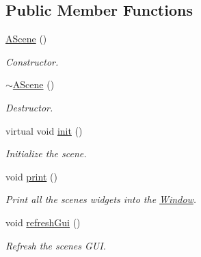 \subsection*{Public Member Functions}
\begin{DoxyCompactItemize}
\item 
\mbox{\label{classAScene_ad0eacf691dbc8240fdf3a42d450c1042}} 
\hyperlink{classAScene_ad0eacf691dbc8240fdf3a42d450c1042}{A\+Scene} ()
\begin{DoxyCompactList}\small\item\em Constructor. \end{DoxyCompactList}\item 
\mbox{\label{classAScene_a9faf7f1a271327227e83627432d0b210}} 
\hyperlink{classAScene_a9faf7f1a271327227e83627432d0b210}{$\sim$\+A\+Scene} ()
\begin{DoxyCompactList}\small\item\em Destructor. \end{DoxyCompactList}\item 
\mbox{\label{classAScene_aa082a5b5f577efd2df8b6436afd28944}} 
virtual void \hyperlink{classAScene_aa082a5b5f577efd2df8b6436afd28944}{init} ()
\begin{DoxyCompactList}\small\item\em Initialize the scene. \end{DoxyCompactList}\item 
\mbox{\label{classAScene_a0170b6a47bb2cc189bfacb432a0b4332}} 
void \hyperlink{classAScene_a0170b6a47bb2cc189bfacb432a0b4332}{print} ()
\begin{DoxyCompactList}\small\item\em Print all the scene\textquotesingle{}s widgets into the \hyperlink{classWindow}{Window}. \end{DoxyCompactList}\item 
\mbox{\label{classAScene_a39a67b761f9c0508f3f358f00fa941a1}} 
void \hyperlink{classAScene_a39a67b761f9c0508f3f358f00fa941a1}{refresh\+Gui} ()
\begin{DoxyCompactList}\small\item\em Refresh the scene\textquotesingle{}s G\+UI. \end{DoxyCompactList}\item 

\end{DoxyCompactItemize}
